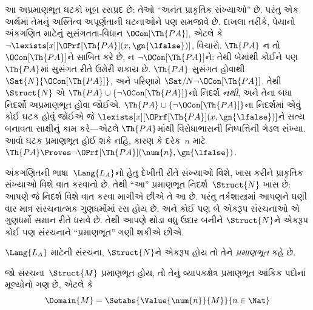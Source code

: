 આ અપ્રમાણભૂત ઘટકો ખૂબ રસપ્રદ છે: તેઓ ``અનંત પ્રાકૃતિક સંખ્યાઓ'' છે.
પરંતુ એક અર્થમાં તેમનું અસ્તિત્વ અપૂર્ણતાની ઘટનાઓને પણ સમજાવે છે.
દાખલા તરીકે, પેયાનો અંકગણિત માટેનું સુસંગતતા-વિધાન
$\OCon[\Th{PA}]$, એટલે કે
$\lnot\lexists[x][\OPrf[\Th{PA}](x,\gn{\lfalse})]$, વિચારો.
$\Th{PA}$ ન તો $\OCon[\Th{PA}]$ને સાબિત કરે છે, ન
$\lnot\OCon[\Th{PA}]$ને; તેથી
બેમાંથી કોઈને પણ $\Th{PA}$માં સુસંગત રીતે ઉમેરી શકાય છે. $\Th{PA}$
સુસંગત હોવાથી $\Sat{N}{\OCon[\Th{PA}]}$, અને પરિણામે
$\Sat/{N}{\lnot\OCon[\Th{PA}]}$. તેથી $\Struct{N}$ એ
$\Th{PA}\cup\{\lnot\OCon[\Th{PA}]\}$નો નિદર્શ \emph{નથી}, અને તેના
બધા નિદર્શો અપ્રમાણભૂત હોવા જોઈએ.
$\Th{PA}\cup\{\lnot\OCon[\Th{PA}]\}$ના નિદર્શમાં એવું કોઈ
ઘટક હોવું જોઈએ જે
$\lexists[x][\OPrf[\Th{PA}](x,\gn{\lfalse})]$ને સત્ય બનાવતા સાક્ષીનું
કામ કરે—એટલે $\Th{PA}$માંથી વિરોધાભાસની નિષ્પત્તિની ગેડલ સંખ્યા.
આવો ઘટક પ્રમાણભૂત હોઈ શકે નહિ, કારણ કે દરેક~$n$ માટે
$\Th{PA}\Proves\lnot\OPrf[\Th{PA}](\num{n},\gn{\lfalse})$.
\endgroup


\begingroup
\makeatletter{}\makeatother

\label{guunit:OLP-0193}


અંકગણિતની ભાષા~$\Lang{L_A}$નો હેતુ દેખીતી રીતે સંખ્યાઓ વિશે,
ખાસ કરીને પ્રાકૃતિક સંખ્યાઓ વિશે વાત કરવાનો છે. તેથી ``આ'' પ્રમાણભૂત
નિદર્શ~$\Struct{N}$ ખાસ છે: આપણે જે નિદર્શ વિશે વાત કરવા માગીએ છીએ
તે આ છે. પરંતુ તર્કશાસ્ત્રમાં આપણને ઘણી વાર માત્ર સંરચનાત્મક
ગુણધર્મોમાં રસ હોય છે, અને કોઈ પણ બે એકરૂપ સંરચનાઓ એ ગુણધર્મો
સમાન રીતે ધરાવે છે. તેથી આપણે થોડા વધુ ઉદાર બનીને $\Struct{N}$ને
એકરૂપ કોઈ પણ સંરચનાને ``પ્રમાણભૂત'' ગણી શકીએ છીએ.

\begin{defn}
$\Lang{L_A}$ માટેની સંરચના, $\Struct{N}$ને એકરૂપ હોય તો તેને
\emph{પ્રમાણભૂત} કહે છે.
\end{defn}

\begin{prop}
 જો સંરચના~$\Struct{M}$
પ્રમાણભૂત હોય, તો તેનું વ્યાપકક્ષેત્ર પ્રમાણભૂત આંકિક પદોનાં મૂલ્યોનો
ગણ છે, એટલે કે
\[
\Domain{M} = \Setabs{\Value{\num{n}}{M}}{n \in \Nat}
\]
\end{prop}

